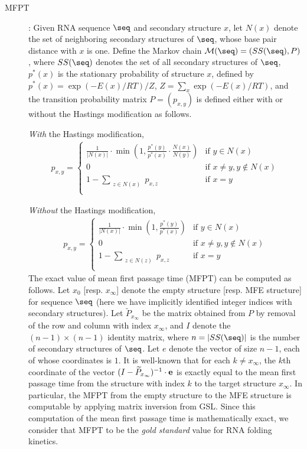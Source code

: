 \begin{description}
\item[MFPT]: Given RNA sequence $\seq$ and secondary structure $x$,
let $N(x)$ denote the set of neighboring secondary structures of
$\seq$, whose base pair distance with $x$ is one. Define the Markov
chain $\mathcal{M}(\seq)=(SS(\seq),P)$, where $SS(\seq)$ denotes the
set of all secondary structures of $\seq$, $p^*(x)$ is the stationary
probability of structure $x$, defined by $p^*(x)=\exp(-E(x)/RT)/Z$,
$Z=\sum_{x} \exp(-E(x)/RT)$, and the transition probability matrix $P
= ( p_{x,y} )$ is defined either with or without the Hastings
modification as follows.

{\em With} the Hastings modification,
\begin{eqnarray}
\label{eq:MFPTwithHastings} p_{x,y} = \left\{
\begin{array}{ll}
\frac{1}{|N(x)|} \cdot \min(1, \frac{p^*(y)}{p^*(x)} \cdot
\frac{N(x)}{N(y)}) &\mbox{if $y \in N(x)$}\\
0 &\mbox{if $x \ne y, y \not\in N(x)$}\\
1 - \sum_{\substack{z \in N(x)}} p_{x,z} &\mbox{if $x=y$}\\
\end{array}
\right.
\end{eqnarray}

{\em Without} the Hastings modification,
\begin{eqnarray}
\label{eq:MFPTwithoutHastings} p_{x,y} = \left\{
\begin{array}{ll}
\frac{1}{|N(x)|} \cdot \min(1, \frac{p^*(y)}{p^*(x)} ) &\mbox{if $y
\in N(x)$}\\
0 &\mbox{if $x \ne y, y \not\in N(x)$}\\
1 - \sum_{\substack{z \in N(z)}} p_{x,z} &\mbox{if $x=y$}\\
\end{array}
\right.
\end{eqnarray}
The exact value of mean first passage time (MFPT) can be computed as
follows. Let $x_0$ [resp. $x_{\infty}$] denote the empty structure
[resp. MFE structure] for sequence $\seq$ (here we have implicitly
identified integer indices with secondary structures). Let
$\widetilde{P}_{x_{\infty}}$ be the matrix obtained from $P$ by
removal of the row and column with index $x_{\infty}$, and $I$ denote
the $(n-1)\times(n-1)$ identity matrix, where $n=|SS(\seq)|$ is the
number of secondary structures of $\seq$. Let $e$ denote the vector of
size $n-1$, each of whose coordinates is $1$. It is well-known
\cite{meyerMFPT} that for each $k\ne x_{\infty}$, the $k$th coordinate
of the vector $(I - \widetilde{P}_{x_{\infty}})^{-1} \cdot {\bf e}$ is
exactly equal to the mean first passage time from the structure with
index $k$ to the target structure $x_{\infty}$. In particular, the
MFPT from the empty structure to the MFE structure is computable by
applying matrix inversion from GSL. Since this computation of the
mean first passage time is mathematically exact, we consider that MFPT
to be the {\em gold standard} value for RNA folding kinetics.


\end{description}
